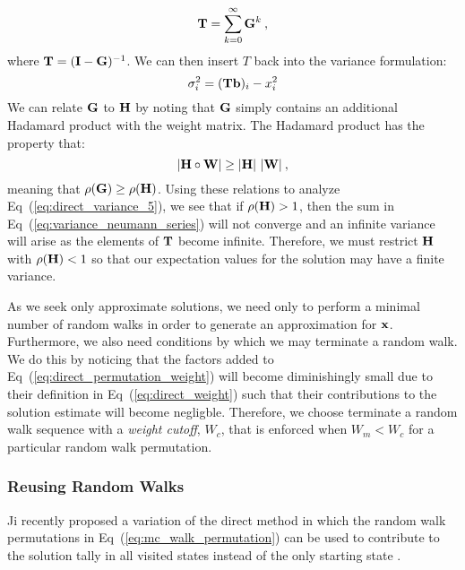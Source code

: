 \begin{equation}
  \mathbf{T} = \sum_{k=0}^{\infty} \mathbf{G}^k\:,
  \label{eq:variance_neumann_series}
\end{equation}
where $\mathbf{T} = (\mathbf{I}-\mathbf{G})^{-1}$. We can then insert $T$ back
into the variance formulation:
\begin{equation}
  \sigma^2_i = (\mathbf{T}\mathbf{b})_i - x_i^2
  \label{eq:direct_variance_5}
\end{equation}
We can relate $\mathbf{G}$ to $\mathbf{H}$ by noting that $\mathbf{G}$ simply
contains an additional Hadamard product with the weight matrix. The
Hadamard product has the property that:
\begin{equation}
  |\mathbf{H} \circ \mathbf{W}| \geq |\mathbf{H}|\ |\mathbf{W}|\:,
  \label{eq:hadamard_inequality}
\end{equation}
meaning that $\rho(\mathbf{G}) \geq \rho(\mathbf{H})$. Using these relations
to analyze Eq~(\ref{eq:direct_variance_5}), we see that if
$\rho(\mathbf{H}) > 1$, then the sum in
Eq~(\ref{eq:variance_neumann_series}) will not converge and an
infinite variance will arise as the elements of $\mathbf{T}$ become
infinite. Therefore, we must restrict $\mathbf{H}$ with $\rho(\mathbf{H}) < 1$
so that our expectation values for the solution may have a finite
variance.

As we seek only approximate solutions, we need only to perform a
minimal number of random walks in order to generate an approximation
for $\mathbf{x}$. Furthermore, we also need conditions by which we may
terminate a random walk. We do this by noticing that the factors added
to Eq~(\ref{eq:direct_permutation_weight}) will become diminishingly
small due to their definition in Eq~(\ref{eq:direct_weight}) such that
their contributions to the solution estimate will become
negligble. Therefore, we choose terminate a random walk sequence with
a \textit{weight cutoff}, $W_c$, that is enforced when $W_m < W_c$ for
a particular random walk permutation.

\subsubsection{Reusing Random Walks}
\label{subsubsec:reusing_random_walks}
Ji recently proposed a variation of the direct method in which the
random walk permutations in Eq~(\ref{eq:mc_walk_permutation}) can be
used to contribute to the solution tally in all visited states instead
of the only starting state \citep{ji_reusing_2012}.

